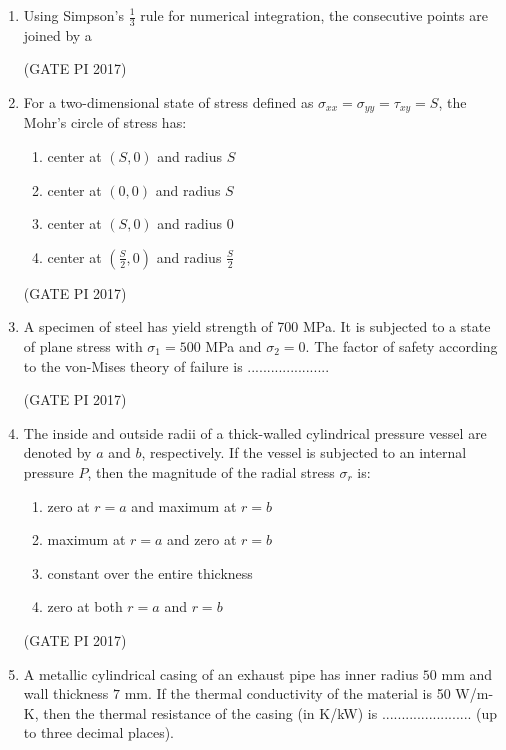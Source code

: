 \documentclass[journal,12pt,onecolumn]{IEEEtran}
\theoremstyle{remark}
\begin{document}
\begin{enumerate}
\item Using Simpson's $\frac{1}{3}$ rule for numerical integration, the consecutive points are joined by a
\begin{enumerate}
\end{enumerate}
\hfill (GATE PI 2017)

\item For a two-dimensional state of stress defined as $\sigma_{xx} = \sigma_{yy} = \tau_{xy} = S$, the Mohr's circle of stress has:
\begin{enumerate}
\item center at $(S, 0)$ and radius $S$
\item center at $(0, 0)$ and radius $S$
\item center at $(S, 0)$ and radius $0$
\item center at $(\frac{S}{2}, 0)$ and radius $\frac{S}{2}$
\end{enumerate}
\hfill (GATE PI 2017)

\item A specimen of steel has yield strength of 700 MPa. It is subjected to a state of plane stress with $\sigma_1 = 500$ MPa and $\sigma_2 = 0$. The factor of safety according to the von-Mises theory of failure is .....................

\hfill (GATE PI 2017) 


\item The inside and outside radii of a thick-walled cylindrical pressure vessel are denoted by $a$ and $b$, respectively. If the vessel is subjected to an internal pressure $P$, then the magnitude of the radial stress $\sigma_r$ is:
\begin{enumerate}
\item zero at $r = a$ and maximum at $r = b$
\item maximum at $r = a$ and zero at $r = b$
\item constant over the entire thickness
\item zero at both $r = a$ and $r = b$
\end{enumerate}
\hfill (GATE PI 2017)

\item A metallic cylindrical casing of an exhaust pipe has inner radius $50$ mm and wall thickness $7$ mm. If the thermal conductivity of the material is 50 W/m-K, then the thermal resistance of the casing (in K/kW) is ....................... (up to three decimal places).  


\end{enumerate}
\end{document}
